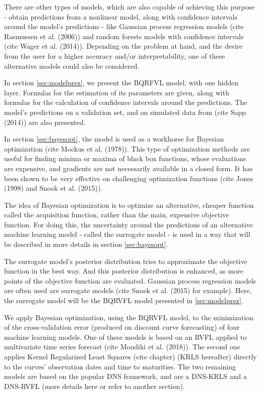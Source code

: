 \medskip 

There are other types of models, which are also capable of achieving this purpose - obtain predictions from a nonlinear model, along with confidence intervals around the model's predictions - like Gaussian process regression models (cite Rasmussen et al. (2006)) and random forests models with confidence intervals (cite Wager et al. (2014)). Depending on the problem at hand, and the desire from the user for a higher  accuracy and/or interpretability, one of these alternative models could also be considered.    

\medskip 

In section \ref{sec:modelprez}, we present the BQRFVL model, with one hidden layer. Formulas for the estimation of its parameters are given, along with formulas for the calculation of confidence intervals around the predictions. The model's predictions on a validation set, and on simulated data from (cite Sapp (2014)) are also presented. 

\medskip 

In section \ref{sec:bayesopt}, the model is used as a workhorse for Bayesian optimization (cite Mockus et al. (1978)). This type of optimization methods are useful for finding minima or maxima of black box functions, whose evaluations are expensive, and gradients are not necessarily available in a closed form. It has been shown to be very effective on challenging optimization functions (cite Jones (1998) and Snoek et al. (2015)).

\medskip 

The idea of Bayesian optimization is to optimize an alternative, cheaper function called the acquisition function, rather than the main, expensive objective function. For doing this, the uncertainty around the predictions of an alternative machine learning model - called the surrogate model - is used in a way that will be described in more details in section \ref{sec:bayesopt}. 

\medskip 

The surrogate model's posterior distribution tries to approximate the objective function in the best way. And this posterior distribution is enhanced, as more points of the objective function are evaluated. Gaussian process regression models are often used are surrogate models (cite Snoek et al. (2015) for example). Here, the surrogate model will be the BQRVFL model presented in \ref{sec:modelprez}.

\medskip 

We apply Bayesian optimization, using the BQRVFL model, to the minimization of the cross-validation error (produced on discount curve forecasting) of four machine learning models. One of these models is based on an RVFL applied to multivariate time series forecast (cite Moudiki et al. (2018)). The second one applies Kernel Regularized Least Squares (cite chapter) (KRLS hereafter) directly to the curves' observation dates and time to maturities. The two remaining models are based on the popular DNS framework, and are a DNS-KRLS and a DNS-RVFL (more details here or refer to another section). 

